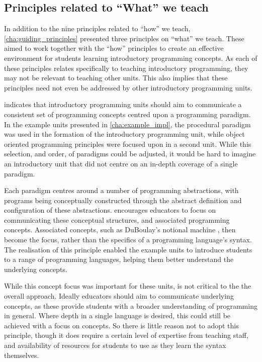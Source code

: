 


\subsection{Principles related to ``What'' we teach} %
\label{sub:principles_related_to_}

In addition to the nine principles related to ``how'' we teach, \cref{cha:guiding_principles} presented three principles on ``what'' we teach. These aimed to work together with the ``how'' principles to create an effective environment for students learning introductory programming concepts. As each of these principles relates specifically to teaching introductory programming, they may not be relevant to teaching other units. This also implies that these principles need not even be addressed by other introductory programming units.

 indicates that introductory programming units should aim to communicate a  consistent set of programming concepts centred upon a programming paradigm. In the example units presented in \cref{cha:example_impl}, the procedural paradigm was used in the formation of the introductory programming unit, while object oriented programming principles were focused upon in a second unit. While this selection, and order, of paradigms could be adjusted, it would be hard to imagine an introductory unit that did not centre on an in-depth coverage of a single paradigm.  

Each paradigm centres around a number of programming abstractions, with programs being conceptually constructed through the abstract definition and configuration of these abstractions.  encourages educators to focus on communicating these conceptual structures, and associated programming concepts. Associated concepts, such as DuBoulay's notional machine \cite{DuBoulay:1986}, then become the focus, rather than the specifics of a programming language's syntax. The realisation of this principle enabled the example units to introduce students to a range of programming languages, helping them better understand the underlying concepts. 

While this concept focus was important for these units,  is not critical to the the overall approach. Ideally educators should aim to communicate underlying concepts, as these provide students with a broader understanding of programming in general. Where depth in a single language is desired, this could still be achieved with a focus on concepts. So there is little reason not to adopt this principle, though it does require a certain level of expertise from teaching staff, and availability of resources for students to use as they learn the syntax themselves.   

